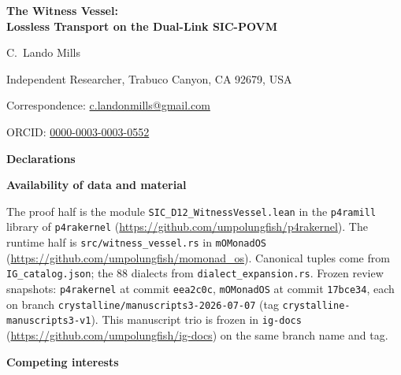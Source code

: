\documentclass[12pt,a4paper]{article}
\begin{document}
\begin{center}

\vspace*{1.5em}

{\LARGE\bfseries The Witness Vessel:\\[0.4em]
Lossless Transport on the Dual-Link SIC-POVM}

\vspace{1.5em}

{\large C.\ Lando Mills}

\vspace{0.6em}

{\normalsize Independent Researcher, Trabuco Canyon, CA 92679, USA}

\vspace{0.4em}

{\normalsize Correspondence: \href{mailto:c.landonmills@gmail.com}{c.landonmills@gmail.com}}

\vspace{0.2em}

{\normalsize ORCID: \href{https://orcid.org/0000-0003-0003-0552}{0000-0003-0003-0552}}

\end{center}

\vspace{1.5em}

\noindent\textbf{Declarations}

\vspace{0.8em}

\noindent\textbf{Availability of data and material}

\noindent
The proof half is the module \texttt{SIC\_D12\_WitnessVessel.lean} in the \texttt{p4ramill}
library of \texttt{p4rakernel} (\url{https://github.com/umpolungfish/p4rakernel}).
The runtime half is \texttt{src/witness\_vessel.rs} in \texttt{mOMonadOS}
(\url{https://github.com/umpolungfish/momonad_os}).
Canonical tuples come from \texttt{IG\_catalog.json}; the 88 dialects from
\texttt{dialect\_expansion.rs}.
Frozen review snapshots: \texttt{p4rakernel} at commit \texttt{eea2c0c},
\texttt{mOMonadOS} at commit \texttt{17bce34}, each on branch
\texttt{crystalline/manuscripts3-2026-07-07} (tag \texttt{crystalline-manuscripts3-v1}).
This manuscript trio is frozen in \texttt{ig-docs}
(\url{https://github.com/umpolungfish/ig-docs}) on the same branch name and tag.

\vspace{1em}

\noindent\textbf{Competing interests}
\end{document}
